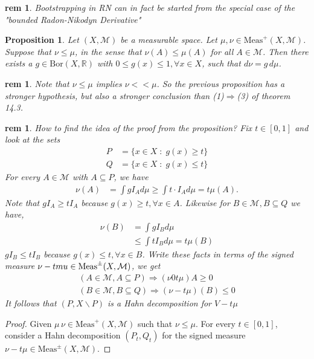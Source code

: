 \documentclass[letterpaper, 12pt]{article}
\newcommand{\st}{\; : \; }
\newcommand{\fin}{\qquad \quad \hfill \framebox[1.75mm][l]{\,}}
\newcommand{\cM}{\mathcal{M}}
\newcommand{\bR}{\mathbb{R}}
\newcommand{\Meas}{\mathrm{Meas}}
\newcommand{\Bor}{\mathrm{Bor}}
\theoremstyle{stdthm}
\newtheorem{prop}[thm]{Proposition}
\theoremstyle{stddef}
\newtheorem{rem}[thm]{rem} %
\theoremstyle{stdnonum}
\theoremstyle{stdqands}
\theoremstyle{stdbold}
\begin{document}
\begin{rem}
Bootstrapping in RN can in fact be started from the special case of the  "bounded Radon-Nikodyn Derivative"
\end{rem}

\begin{prop}
Let $(X,\cM)$ be a measurable space. Let $\mu,\nu\in\Meas^+(X,\cM)$. Suppose that $\nu\leq \mu$, in the sense that $\nu(A)\leq \mu(A)$ for all $A\in\cM$. Then there exists a $g\in\Bor(X,\bR)$ with $0\leq g(x) \leq 1, \forall x\in X$, such that $d\nu = g\, d\mu$.
\end{prop}

\begin{rem}
Note that $\nu\leq\mu$ implies $\nu<<\mu$. So the previous proposition has a stronger hypothesis, but also a stronger conclusion than (1)$\Longrightarrow$(3) of theorem 14.3.
\end{rem}


\begin{rem}
How to find the idea of the proof from the proposition? Fix $t \in [0,1]$ and look at the sets
\begin{align*}
P &= \{ x \in X \st g(x) \geq t \}\\
Q &= \{x \in X \st g(x) \leq t \}
\end{align*}
For every $A \in \cM$ with $A\subseteq P$, we have 
\begin{align*}
\nu(A) &= \int gI_A d\mu \geq \int t \cdot I_A d\mu =t \mu(A).
\end{align*}
Note that $gI_A \geq tI_A$ because $g(x) \geq t, \forall x \in A$. Likewise for $B \in \cM, B \subseteq Q$ we have, 
\begin{align*}
\nu(B) &= \int gI_B d\mu \\
& \leq \int t I_B d \mu = t \mu(B)
\end{align*}
$gI_B \leq tI_B$ because $g(x) \leq t, \forall x \in B$. Write these facts in terms of the signed measure $\nu - t\\mu \in \Meas^\pm(X,\cM)$, we get
\begin{align*}
(A \in \cM, A \subseteq P) \Rightarrow (\nu 0 t\mu) A \geq 0\\
(B \in \cM, B \subseteq Q) \Rightarrow (\nu - t\mu) (B) \leq 0
\end{align*}
It follows that $(P,X\backslash P)$ is a Hahn decomposition for $V - t\mu$
\end{rem}

\begin{proof}
Given $\mu\,\nu\in\Meas^+(X,\cM)$ such that $\nu\leq \mu$. For every $t\in[0,1]$, consider a Hahn decomposition $(P_t,Q_t)$ for the signed measure $\nu-t\mu\in\Meas^\pm(X,\cM)$.
\end{proof}
\end{document}
